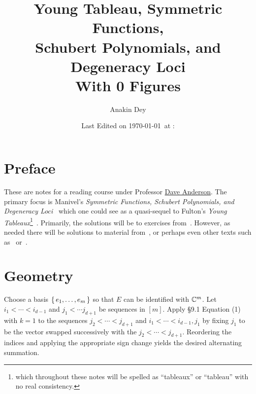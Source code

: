 \documentclass[letterpaper, 11pt, oneside]{book}
\title{\vspace{-100pt} {\Huge Young Tableau, Symmetric Functions, \protect\\ Schubert Polynomials, and Degeneracy Loci} \\ {\small With 0 Figures}}
\author{\Large Anakin Dey}
\date{\small Last Edited on \today\ at \DTMfetchhour{now}:\DTMfetchminute{now}}
\newcommand{\CoverName}{Cover}
\begin{document}
\frontmatter
\renewcommand{\thepage}{\CoverName}
\maketitle


\tableofcontents
\clearpage


%

\chapter*{Preface}

These are notes for a reading course under Professor \href{https://people.math.osu.edu/anderson.2804/index.html}{Dave Anderson}.
The primary focus is Manivel's \emph{Symmetric Functions, Schubert Polynomials, and Degeneracy Loci}~\cite{book:Manivel} which one could see as a quasi-sequel to Fulton's \emph{Young Tableaux}\footnote{which throughout these notes will be spelled as ``tableaux'' or ``tableau'' with no real consistency.}~\cite{book:YT}.
Primarily, the solutions will be to exercises from~\cite{book:Manivel}.
However, as needed there will be solutions to material from~\cite{book:YT}, or perhaps even other texts such as~\cite{book:MacdonaldSymmetricHall} or~\cite{book:ECII}.

\mainmatter

\chapter{\cite{book:YT} Geometry}

\begin{sol}\label{ex:YT_9.1.1}
  Choose a basis $\set{e_{1}, \ldots, e_{m}}$ so that $E$ can be identified with $\mathbb{C}^{m}$.
  Let $i_{1} < \cdots < i_{d - 1}$ and $j_{1} < \cdots j_{d + 1}$ be sequences in $[m]$.
  Apply \S 9.1 Equation (1) with $k = 1$ to the sequences $j_{2} < \cdots < j_{d + 1}$ and $i_{1} < \cdots < i_{d - 1}, j_{1}$ by fixing $j_{1}$ to be the vector swapped successively with the $j_{2} < \cdots < j_{d + 1}$.
  Reordering the indices and applying the appropriate sign change yields the desired alternating summation.
\end{sol}
\end{document}
